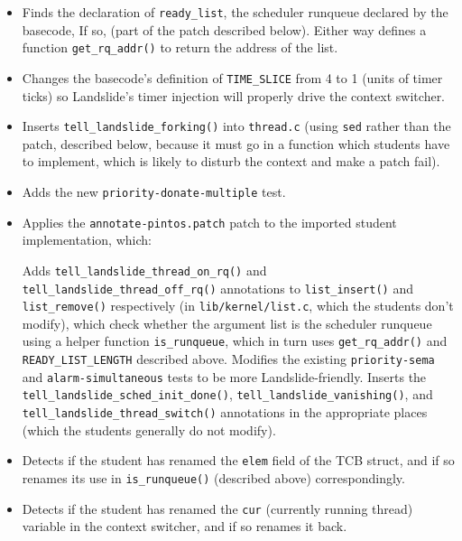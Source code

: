 \begin{itemize}
	\item Finds the declaration of {\tt ready\_list}, the scheduler runqueue declared by the basecode,
		If so,
		(part of the patch described below).
		Either way defines a function {\tt get\_rq\_addr()} to return the address of the %
		list.
	\item Changes the basecode's definition of {\tt TIME\_SLICE} from 4 to 1 (units of timer ticks)
		so Landslide's timer injection will properly drive the context switcher.
	\item Inserts {\tt tell\_landslide\_forking()} into {\tt thread.c}
		(using {\tt sed} rather than the patch, described below,
		because it must go in a function which students have to implement,
		which is likely to disturb the context and make a patch fail).
	\item Adds the new {\tt priority-donate-multiple} test.
	\item Applies the {\tt annotate-pintos.patch} patch to the imported student implementation, which:
	\begin{itemize}
		\llitem Adds {\tt tell\_landslide\_thread\_on\_rq()}
			and {\tt tell\_landslide\_thread\_off\_rq()}
			annotations
			to {\tt list\_insert()} and {\tt list\_remove()} respectively
			(in {\tt lib/kernel/\allowbreak{}list.c}, which the students don't modify),
			which
			check whether the argument list
			is the scheduler runqueue
			using a helper function {\tt is\_runqueue},
			which in turn uses {\tt get\_rq\_addr()} and {\tt READY\_LIST\_LENGTH} described above.
		\llitem Modifies the existing {\tt priority-sema} and {\tt alarm-simultaneous} tests to be more Landslide-friendly.
		\llitem Inserts the {\tt tell\_landslide\_sched\_init\_done()},
			{\tt tell\_landslide\_vanishing()},
			and {\tt tell\_landslide\_thread\_switch()}
			annotations in the appropriate places
			(which the students generally do not modify).
	\end{itemize}
	\item Detects if the student has renamed the {\tt elem} field of the TCB struct,
		and if so renames its use in {\tt is\_runqueue()} (described above) correspondingly.
	\item Detects if the student has renamed the {\tt cur} (currently running thread) variable
		in the context switcher, and if so renames it back.
\end{itemize}

